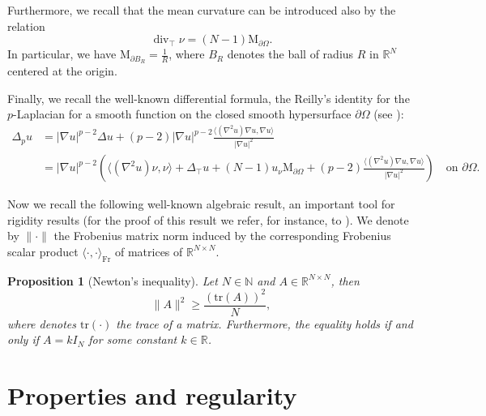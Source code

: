 \documentclass[10pt,a4paper, reqno]{amsart}
\numberwithin{equation}{section}
\newcommand{\R}{\mathbb{R}}
\newcommand{\N}{\mathbb{N}}
\newtheorem{prop}[teo]{Proposition}
\renewcommand{\div}{\operatorname{div}}
\begin{document}
Furthermore, we recall that the mean curvature can be introduced also by the relation 
\begin{equation*}
\div_{\top} \nu = (N-1) \mathrm{M}_{\partial\Omega}.    
\end{equation*} 
In particular, we have $\mathrm{M}_{\partial B_R} = \frac{1}{R}$, where $B_R$ denotes the ball of radius $R$ in $\R^N$ centered at the origin.

Finally, we recall the well-known differential formula, the Reilly's identity for the $p$-Laplacian for a smooth function on the closed smooth hypersurface $\partial \Omega$ (see \cite{hepi18}):
\begin{equation}\label{eq: reilly formula}
\begin{split}
    \Delta_p u & = |\nabla u|^{p-2} \Delta u + (p-2) |\nabla u|^{p-2} \frac{\langle(\nabla^2u)\nabla u,\nabla u\rangle}{|\nabla u|^{2}}
    \\
    & = |\nabla u|^{p-2} \left( \langle(\nabla^2u)\nu,\nu\rangle + \Delta_\top u  + (N-1) u_\nu \mathrm{M}_{\partial\Omega} + (p-2)\frac{\langle(\nabla^2u)\nabla u,\nabla u\rangle}{|\nabla u|^{2}} \right) \quad \text{on } \partial\Omega.
\end{split}
\end{equation}


Now we recall the following well-known algebraic result, an important tool for rigidity results (for the proof of this result we refer, for instance, to \cite[Prop. 2.4]{CoFe20}). We denote
by $\|\cdot\|$ the Frobenius matrix norm induced by the corresponding Frobenius scalar product $\langle \cdot , \cdot \rangle_{\mathrm{Fr}}$ of matrices of $\R^{N\times N}$.

\begin{prop}[Newton’s inequality] \label{prop newton}
    Let $N \in \N$ and $A \in \R^{N \times N}$, then 
    \begin{equation*}
        \|A\|^2 \geq \frac{(\mathrm{tr}(A))^2}{N},
    \end{equation*}
    where denotes $\mathrm{tr}(\cdot)$ the trace of a matrix. Furthermore, the equality holds if and only if $A = k I_N$ for some constant $k \in \R$.
\end{prop}




\section{Properties and regularity}\label{sec: properties and regularity}
\end{document}
